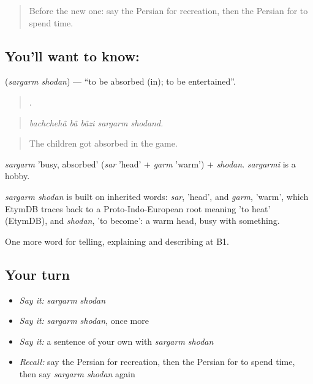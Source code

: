 \label{lesson:FA-C510-sargarm-shodan}



\begin{quote}
Before the new one: say the Persian for recreation, then the Persian for to spend time.
\end{quote}

\subsection*{You'll want to know:  }
\textbf{ } (\emph{sargarm shodan}) — \textquotedblleft{}to be absorbed (in); to be entertained\textquotedblright{}.

\begin{quote}
     .
\end{quote}

\begin{quote}
\emph{bachchehâ bâ bâzi sargarm shodand.}
\end{quote}

\begin{quote}
The children got absorbed in the game.
\end{quote}

\emph{sargarm} 'busy, absorbed' (\emph{sar} 'head' + \emph{garm} 'warm') + \emph{shodan}. \emph{sargarmi} is a hobby.

\begin{cousinweb}
\emph{sargarm shodan} is built on inherited words: \emph{sar}, 'head', and \emph{garm}, 'warm', which EtymDB traces back to a Proto-Indo-European root meaning 'to heat' (EtymDB), and \emph{shodan}, 'to become': a warm head, busy with something.
\end{cousinweb}

\begin{grammarlens}[title={What you've built}]
One more word for telling, explaining and describing at B1.
\end{grammarlens}

\subsection*{Your turn}
\begin{itemize}
\raggedright
  \item \emph{Say it:} \emph{sargarm shodan}
  \item \emph{Say it:} \emph{sargarm shodan}, once more
  \item \emph{Say it:} a sentence of your own with \emph{sargarm shodan}
  \item \emph{Recall:} say the Persian for recreation, then the Persian for to spend time, then say \emph{sargarm shodan} again
\end{itemize}

